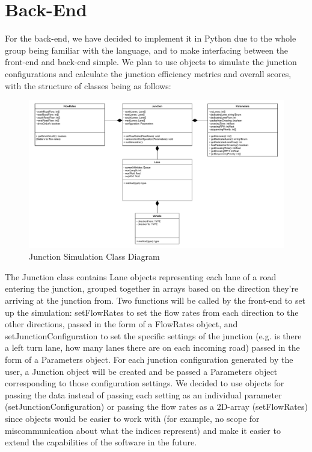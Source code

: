 \documentclass{article}
\begin{document}
\section{Back-End}
For the back-end, we have decided to implement it in Python due to the whole group being familiar with the language, and to make 
interfacing between the front-end and back-end simple. We plan to use objects to simulate the junction configurations and calculate 
the junction efficiency metrics and overall scores, with the structure of classes being as follows:
\begin{figure}[H]
    \centering
    \includegraphics[width=1\linewidth]{JunctionSimulationClassDiagram.drawio.pdf}
    \caption{Junction Simulation Class Diagram}
    \label{class diagram}
\end{figure}
The Junction class contains Lane objects representing each lane of a road entering the junction, grouped together in arrays based on 
the direction they’re arriving at the junction from. Two functions will be called by the front-end to set up the simulation: setFlowRates 
to set the flow rates from each direction to the other directions, passed in the form of a FlowRates object, and setJunctionConfiguration 
to set the specific settings of the junction (e.g. is there a left turn lane, how many lanes there are on each incoming road) passed in 
the form of a Parameters object. For each junction configuration generated by the user, a Junction object will be created and be passed 
a Parameters object corresponding to those configuration settings. We decided to use objects for passing the data instead of passing each 
setting as an individual parameter (setJunctionConfiguration) or passing the flow rates as a 2D-array (setFlowRates) since objects would 
be easier to work with (for example, no scope for miscommunication about what the indices represent) and make it easier to extend the 
capabilities of the software in the future.
\end{document}
